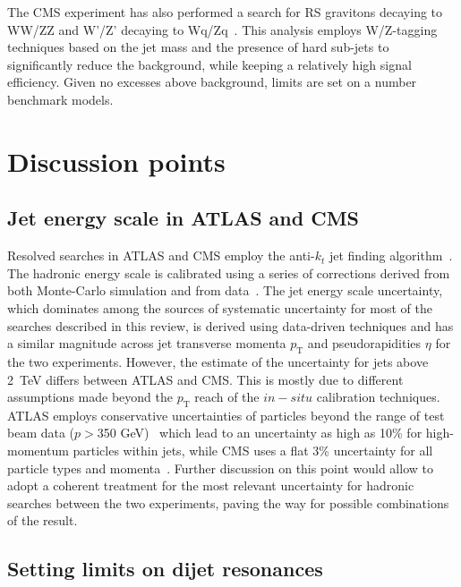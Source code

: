 \documentclass{PoS}
\newcommand{\antikt}{anti-$k_t$}
\begin{document}
The CMS experiment has also performed a search for RS gravitons decaying to 
WW/ZZ and W'/Z' decaying to Wq/Zq~\cite{Chatrchyan:2012ypy}. This analysis employs 
W/Z-tagging techniques based on the jet mass and the presence
of hard sub-jets to significantly reduce the background, while keeping a relatively high signal efficiency. 
Given no excesses above background, limits are set on a number benchmark models. 

\section{Discussion points}

\subsection{Jet energy scale in ATLAS and CMS}

Resolved searches in ATLAS and CMS employ the \antikt{} jet finding algorithm~\cite{Cacciari:2008gp}.
The hadronic energy scale is calibrated using a series of corrections 
derived from both Monte-Carlo simulation and from 
data~\cite{ATLAS-CONF-2013-004, 1748-0221-6-11-P11002, Aad:2011he}. 
The jet energy scale uncertainty, which dominates among the sources of systematic 
uncertainty for most of the searches described in this review, is derived using data-driven 
techniques and has a similar magnitude across
jet transverse momenta $p_\mathrm{T}$ and pseudorapidities $\eta$ for the two experiments. 
However, 
the estimate of the uncertainty for jets above 2~TeV differs between ATLAS and CMS. 
This is mostly due to different assumptions made beyond the
$p_\mathrm{T}$ reach of the $in-situ$ calibration techniques. ATLAS employs conservative
uncertainties of particles beyond the range of test beam data ($p>$350 GeV)~\cite{Aad:2012vm} 
which lead to an uncertainty as high as 10\% for high-momentum particles within jets, 
while CMS uses a flat 3\% uncertainty for all particle types and momenta~\cite{CMS-PAS-JME-10-008}. 
Further discussion on this point would allow to adopt a coherent treatment for 
the most relevant uncertainty for hadronic searches between the two experiments,
paving the way for possible combinations of the result. 

\subsection{Setting limits on dijet resonances}
\end{document}
